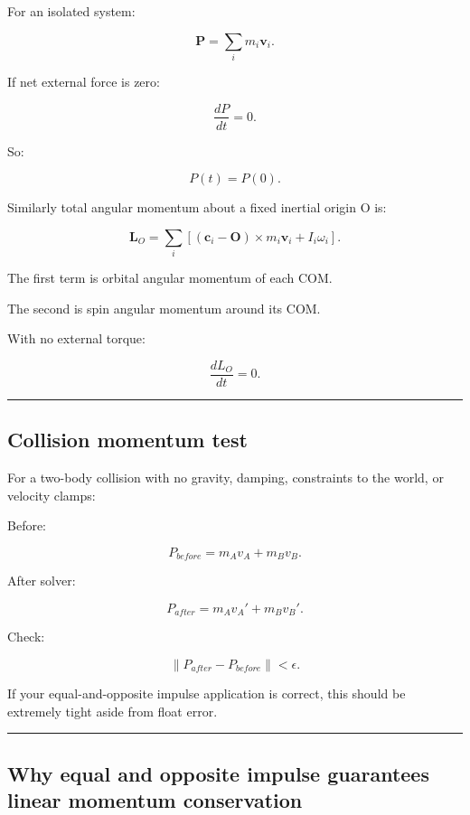 For an isolated system:

\[
\boxed{
\mathbf P
=
\sum_i
m_i\mathbf v_i.
}
\]

If net external force is zero:

\[
\frac{dP}{dt}=0.
\]

So:

\[
P(t)=P(0).
\]

Similarly total angular momentum about a fixed inertial origin O is:

\[
\boxed{
\mathbf L_O
=
\sum_i
[
(\mathbf c_i-\mathbf O)\times m_i\mathbf v_i
+
I_i\omega_i
].
}
\]

The first term is orbital angular momentum of each COM.

The second is spin angular momentum around its COM.

With no external torque:

\[
\frac{dL_O}{dt}=0.
\]

\begin{center}\rule{0.5\linewidth}{0.5pt}\end{center}

\subsection{Collision momentum test}\label{06-engine-ii-ch039-collision-momentum-test}

\hypertarget{06-engine-ii-ch039-collision-momentum-test}{}

For a two-body collision with no gravity, damping, constraints to the world, or velocity clamps:

Before:

\[
P_{before}
=
m_Av_A+
m_Bv_B.
\]

After solver:

\[
P_{after}
=
m_Av_A'+
m_Bv_B'.
\]

Check:

\[
\boxed{
\|P_{after}-P_{before}\|
<
\epsilon.
}
\]

If your equal-and-opposite impulse application is correct, this should be extremely tight aside from float error.

\begin{center}\rule{0.5\linewidth}{0.5pt}\end{center}

\subsection{Why equal and opposite impulse guarantees linear momentum conservation}\label{06-engine-ii-ch039-why-equal-and-opposite-impulse-guarantees-linear-momentum-conservation}

